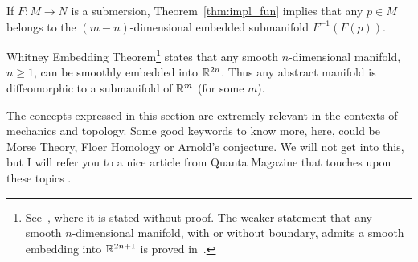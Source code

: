 \begin{remark}
	If $F:M\to N$ is a submersion, Theorem~\ref{thm:impl_fun} implies that any $p\in M$ belongs to the $(m-n)$-dimensional embedded submanifold $F^{-1}(F(p))$.
\end{remark}

%

\begin{remark}\label{rmk:WhitneyET}
	Whitney Embedding Theorem\footnote{See~\cite[Theorem 6.19]{book:lee}, where it is stated without proof. The weaker statement that any smooth $n$-dimensional manifold, with or without boundary, admits a smooth embedding into $\mathbb{R}^{2n+1}$ is proved in~\cite[Theorem 6.15]{book:lee}.} states that any smooth $n$-dimensional manifold, $n\geq1$, can be smoothly embedded into $\mathbb{R}^{2n}$.
	Thus any abstract manifold is diffeomorphic to a submanifold of $\mathbb{R}^m$ (for some $m$).
\end{remark}

\begin{remark}
	The concepts expressed in this section are extremely relevant in the contexts of mechanics and topology.
	Some good keywords to know more, here, could be Morse Theory, Floer Homology or Arnold's conjecture.
	We will not get into this, but I will refer you to a nice article from Quanta Magazine that touches upon these topics \cite{article:quanta:floer}.
\end{remark}

